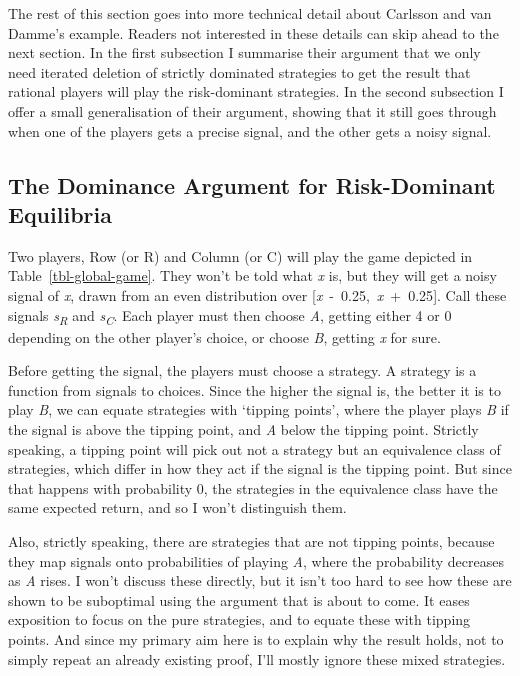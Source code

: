 \documentclass[
  12pt,
  letterpaper,
]{scrbook}
\begin{document}
The rest of this section goes into more technical detail about Carlsson
and van Damme's example. Readers not interested in these details can
skip ahead to the next section. In the first subsection I summarise
their argument that we only need iterated deletion of strictly dominated
strategies to get the result that rational players will play the
risk-dominant strategies. In the second subsection I offer a small
generalisation of their argument, showing that it still goes through
when one of the players gets a precise signal, and the other gets a
noisy signal.

\subsection{The Dominance Argument for Risk-Dominant
Equilibria}\label{sec-cvdproof}

Two players, Row (or R) and Column (or C) will play the game depicted in
Table~\ref{tbl-global-game}. They won't be told what \emph{x} is, but
they will get a noisy signal of \emph{x}, drawn from an even
distribution over {[}\emph{x}~-~0.25,~\emph{x}~+~0.25{]}. Call these
signals \emph{s\textsubscript{R}} and \emph{s\textsubscript{C}}. Each
player must then choose \emph{A}, getting either 4 or 0 depending on the
other player's choice, or choose \emph{B}, getting \emph{x} for sure.

Before getting the signal, the players must choose a strategy. A
strategy is a function from signals to choices. Since the higher the
signal is, the better it is to play \emph{B}, we can equate strategies
with `tipping points', where the player plays \emph{B} if the signal is
above the tipping point, and \emph{A} below the tipping point. Strictly
speaking, a tipping point will pick out not a strategy but an
equivalence class of strategies, which differ in how they act if the
signal is the tipping point. But since that happens with probability 0,
the strategies in the equivalence class have the same expected return,
and so I won't distinguish them.

Also, strictly speaking, there are strategies that are not tipping
points, because they map signals onto probabilities of playing \emph{A},
where the probability decreases as \emph{A} rises. I won't discuss these
directly, but it isn't too hard to see how these are shown to be
suboptimal using the argument that is about to come. It eases exposition
to focus on the pure strategies, and to equate these with tipping
points. And since my primary aim here is to explain why the result
holds, not to simply repeat an already existing proof, I'll mostly
ignore these mixed strategies.
\end{document}

